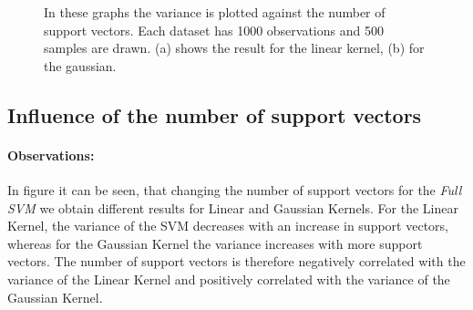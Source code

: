 \documentclass[a4paper]{article}
\begin{document}
\begin{figure}[!htb]
\begin{center}

\caption{In these graphs the variance is plotted against the number of support vectors. Each dataset has 1000 observations and 500 samples are drawn. (a) shows the result for the linear kernel, (b) for the gaussian.}
\label{fig4}
\end{center}
\end{figure}


\subsection{Influence of the number of support vectors}
\paragraph{Observations:}
In figure \label{fig4} it can be seen, that changing the number of support vectors for the \textit{Full SVM} we obtain different results for Linear and Gaussian Kernels. For the Linear Kernel, the variance of the SVM decreases with an increase in support vectors, whereas for the Gaussian Kernel the variance increases with more support vectors. The number of support vectors is therefore negatively correlated with the variance of the Linear Kernel and positively correlated with the variance of the Gaussian Kernel.
\end{document}
